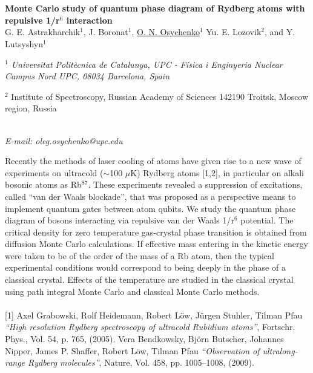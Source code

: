 \newpage
\setcounter{figure}{0}
\section*{}
\begin{center}
{\bf \Large
Monte Carlo study of quantum phase diagram of Rydberg atoms with
repulsive 1/r$^{6}$ interaction
}
\\
\vspace{0.5cm}
G. E. Astrakharchik$^{1}$, J. Boronat$^{1}$, \underline{O. N. Osychenko}$^{1}$
Yu. E. Lozovik$^{2}$, and Y. Lutsyshyn$^{1}$
\\
\vspace{0.5cm}
{\it 
$^{1}$ Universitat Politècnica de Catalunya, UPC - Física i Enginyeria Nuclear
Campus Nord UPC, 08034 Barcelona, Spain

$^{2}$ Institute of Spectroscopy, Russian Academy of Sciences
142190 Troitsk, Moscow region, Russia
}
\\
\vspace{0.5cm}
{\it E-mail: oleg.osychenko@upc.edu}
\\
\vspace{0.5cm}
\end{center}
Recently the methods of laser cooling of atoms have given rise to a new wave of experiments
on ultracold ($\sim$100 $\mu$K) Rydberg atoms [1,2], in particular on alkali bosonic atoms as Rb$^{87}$.
These experiments revealed a suppression of excitations, called “van der Waals blockade”, that
was proposed as a perspective means to implement quantum gates between atom qubits. We study
the quantum phase diagram of bosons interacting via repulsive van der Waals 1/r$^{6}$ potential. The
critical density for zero temperature gas-crystal phase transition is obtained from diffusion Monte
Carlo calculations. If effective mass entering in the kinetic energy were taken to be of the order of
the mass of a Rb atom, then the typical experimental conditions would correspond to being deeply
in the phase of a classical crystal. Effects of the temperature are studied in the classical crystal
using path integral Monte Carlo and classical Monte Carlo methods.
\\
\vspace{0.5cm}
\\
{\footnotesize
[1] Axel Grabowski, Rolf Heidemann, Robert Löw, Jürgen Stuhler, Tilman Pfau \textit{“High resolution Rydberg spectroscopy of ultracold Rubidium atoms”}, Fortschr. Phys., Vol. 54, p. 765, (2005).
\newline
[2] Vera Bendkowsky, Björn Butscher, Johannes Nipper, James P. Shaffer, Robert Löw, Tilman Pfau \textit{“Observation of
ultralong-range Rydberg molecules”}, Nature, Vol. 458, pp. 1005–1008, (2009).
}

